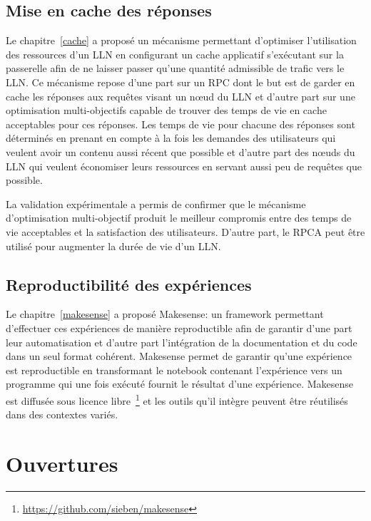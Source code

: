 \subsection{Mise en cache des réponses}

Le chapitre~\ref{cache} a proposé un mécanisme permettant d'optimiser l'utilisation des ressources d'un \ac{LLN} en configurant un cache applicatif s’exécutant sur la passerelle afin de ne laisser passer qu'une quantité admissible de trafic vers le \ac{LLN}.
Ce mécanisme repose d'une part sur un \ac{RPC} dont le but est de garder en cache les réponses aux requêtes visant un nœud du \ac{LLN} et d'autre part sur une optimisation multi-objectifs capable de trouver des temps de vie en cache acceptables pour ces réponses.
Les temps de vie pour chacune des réponses sont déterminés en prenant en compte à la fois les demandes des utilisateurs qui veulent avoir un contenu aussi récent que possible et d'autre part des nœuds du \ac{LLN} qui veulent économiser leurs ressources en servant aussi peu de requêtes que possible.

La validation expérimentale a permis de confirmer que le mécanisme d'optimisation multi-objectif produit le meilleur compromis entre des temps de vie acceptables et la satisfaction des utilisateurs. 
D'autre part, le \ac{RPCA} peut être utilisé pour augmenter la durée de vie d'un \ac{LLN}.

\subsection{Reproductibilité des expériences}

Le chapitre~\ref{makesense} a proposé Makesense: un framework permettant d'effectuer ces expériences de manière reproductible afin de garantir d'une part leur automatisation et d'autre part l'intégration de la documentation et du code dans un seul format cohérent.
Makesense permet de garantir qu'une expérience est reproductible en transformant le notebook contenant l'expérience vers un programme qui une fois exécuté fournit le résultat d'une expérience.
Makesense est diffusée sous licence libre~\footnote{\href{https://github.com/sieben/makesense}{https://github.com/sieben/makesense}} et les outils qu'il intègre peuvent être réutilisés dans des contextes variés.

\section{Ouvertures}

